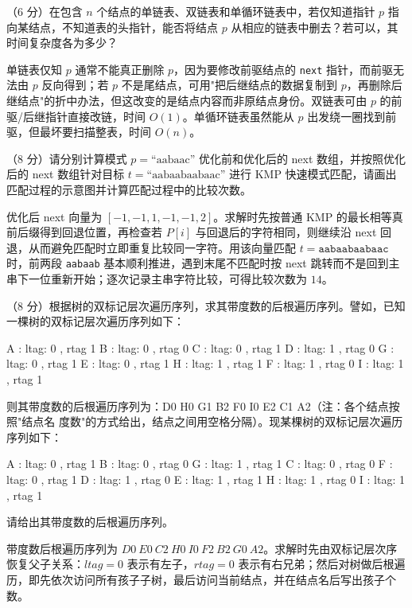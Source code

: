 \begin{question}
（6 分）在包含 $n$ 个结点的单链表、双链表和单循环链表中，若仅知道指针 $p$ 指向某结点，不知道表的头指针，能否将结点 $p$ 从相应的链表中删去？若可以，其时间复杂度各为多少？
\begin{solution}
单链表仅知 $p$ 通常不能真正删除 $p$，因为要修改前驱结点的 \texttt{next} 指针，而前驱无法由 $p$ 反向得到；若 $p$ 不是尾结点，可用"把后继结点的数据复制到 $p$，再删除后继结点"的折中办法，但这改变的是结点内容而非原结点身份。双链表可由 $p$ 的前驱/后继指针直接改链，时间 $O(1)$。单循环链表虽然能从 $p$ 出发绕一圈找到前驱，但最坏要扫描整表，时间 $O(n)$。
\end{solution}
\end{question}

\begin{question}
（8 分）请分别计算模式 $p = \text{``aabaac''}$ 优化前和优化后的 next 数组，并按照优化后的 next 数组针对目标 $t = \text{``aabaabaabaac''}$ 进行 KMP 快速模式匹配，请画出匹配过程的示意图并计算匹配过程中的比较次数。
\begin{solution}
优化后 next 向量为 $[-1,-1,1,-1,-1,2]$。求解时先按普通 KMP 的最长相等真前后缀得到回退位置，再检查若 $P[i]$ 与回退后的字符相同，则继续沿 next 回退，从而避免匹配时立即重复比较同一字符。用该向量匹配 $t=\texttt{aabaabaabaac}$ 时，前两段 \texttt{aabaab} 基本顺利推进，遇到末尾不匹配时按 next 跳转而不是回到主串下一位重新开始；逐次记录主串字符比较，可得比较次数为 $14$。
\end{solution}
\end{question}

\begin{question}
（8 分）根据树的双标记层次遍历序列，求其带度数的后根遍历序列。譬如，已知一棵树的双标记层次遍历序列如下：
\begin{ttbox}
A : ltag: 0 , rtag 1
B : ltag: 0 , rtag 0
C : ltag: 0 , rtag 1
D : ltag: 1 , rtag 0
G : ltag: 0 , rtag 1
E : ltag: 0 , rtag 1
H : ltag: 1 , rtag 1
F : ltag: 1 , rtag 0
I : ltag: 1 , rtag 1
\end{ttbox}
则其带度数的后根遍历序列为：D0 H0 G1 B2 F0 I0 E2 C1 A2（注：各个结点按照"结点名 度数"的方式给出，结点之间用空格分隔）。现某棵树的双标记层次遍历序列如下：
\begin{ttbox}
A : ltag: 0 , rtag 1
B : ltag: 0 , rtag 0
G : ltag: 1 , rtag 1
C : ltag: 0 , rtag 0
F : ltag: 0 , rtag 1
D : ltag: 1 , rtag 0
E : ltag: 1 , rtag 1
H : ltag: 1 , rtag 0
I : ltag: 1 , rtag 1
\end{ttbox}
请给出其带度数的后根遍历序列。
\begin{solution}
带度数后根遍历序列为 $D0\ E0\ C2\ H0\ I0\ F2\ B2\ G0\ A2$。求解时先由双标记层次序恢复父子关系：$ltag=0$ 表示有左子，$rtag=0$ 表示有右兄弟；然后对树做后根遍历，即先依次访问所有孩子子树，最后访问当前结点，并在结点名后写出孩子个数。
\end{solution}
\end{question}

